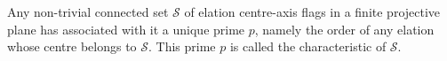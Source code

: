 Any non-trivial connected set $\mathcal{S}$ of elation centre-axis flags in a finite projective plane has associated with it a unique prime $p$, namely the order of any elation whose centre belongs to $\mathcal{S}$. This prime $p$ is called the characteristic of $\mathcal{S}$.
